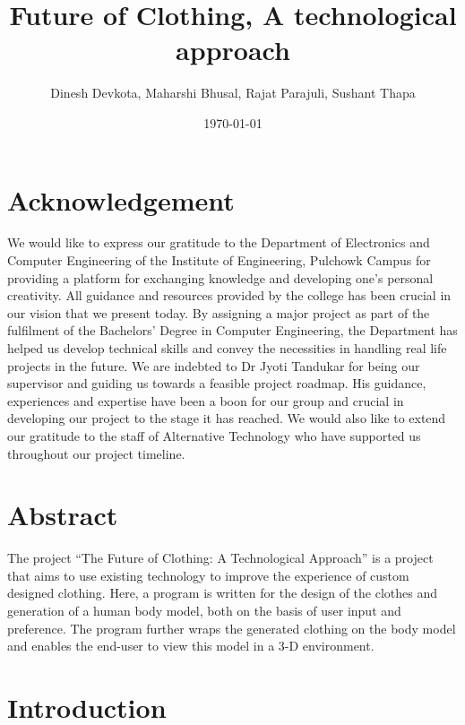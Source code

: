 \documentclass{article}
\title{Future of Clothing, A technological approach}
\author{Dinesh Devkota,
Maharshi Bhusal, Rajat Parajuli, Sushant Thapa}
\date{\today}
\begin{document}
\maketitle
\newpage

\section*{Acknowledgement}
We would like to express our gratitude to the Department of Electronics and Computer Engineering of the Institute of Engineering, Pulchowk Campus for providing a platform for exchanging knowledge and developing one’s personal creativity. All guidance and resources provided by the college has been crucial in our vision that we present today. By assigning a major project as part of the fulfilment of the Bachelors’ Degree in Computer Engineering, the Department has helped us develop technical skills and convey the necessities in handling real life projects in the future.
We are indebted to Dr Jyoti Tandukar for being our supervisor and guiding us towards a feasible project roadmap. His guidance, experiences and expertise have been a boon for our group and crucial in developing our project to the stage it has reached. We would also like to extend our gratitude to the staff of Alternative Technology who have supported us throughout our project timeline.



\newpage

\section*{Abstract}
The project “The Future of Clothing: A Technological Approach” is a project that aims to use existing technology to improve the experience of custom designed clothing. Here, a program is written for the design of the clothes and generation of a human body model, both on the basis of user input and preference. The program further wraps the generated clothing on the body model and enables the end-user to view this model in a 3-D environment.
\newpage

\tableofcontents
\listoffigures


\newpage
{}
\section{Introduction}
\end{document}
